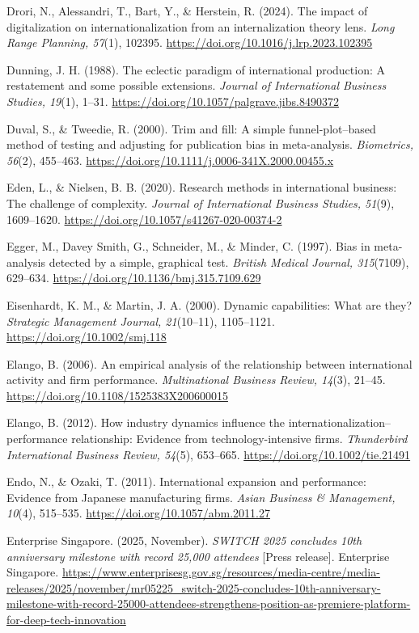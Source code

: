 \documentclass[
  a4paper,
  13pt]{extreport}
\begin{document}
Drori, N., Alessandri, T., Bart, Y., \& Herstein, R. (2024). The impact
of digitalization on internationalization from an internalization theory
lens. \emph{Long Range Planning, 57}(1), 102395.
\url{https://doi.org/10.1016/j.lrp.2023.102395}

Dunning, J. H. (1988). The eclectic paradigm of international
production: A restatement and some possible extensions. \emph{Journal of
International Business Studies, 19}(1), 1--31.
\url{https://doi.org/10.1057/palgrave.jibs.8490372}

Duval, S., \& Tweedie, R. (2000). Trim and fill: A simple
funnel-plot--based method of testing and adjusting for publication bias
in meta-analysis. \emph{Biometrics, 56}(2), 455--463.
\url{https://doi.org/10.1111/j.0006-341X.2000.00455.x}

Eden, L., \& Nielsen, B. B. (2020). Research methods in international
business: The challenge of complexity. \emph{Journal of International
Business Studies, 51}(9), 1609--1620.
\url{https://doi.org/10.1057/s41267-020-00374-2}

Egger, M., Davey Smith, G., Schneider, M., \& Minder, C. (1997). Bias in
meta-analysis detected by a simple, graphical test. \emph{British
Medical Journal, 315}(7109), 629--634.
\url{https://doi.org/10.1136/bmj.315.7109.629}

Eisenhardt, K. M., \& Martin, J. A. (2000). Dynamic capabilities: What
are they? \emph{Strategic Management Journal, 21}(10--11), 1105--1121.
\url{https://doi.org/10.1002/smj.118}

Elango, B. (2006). An empirical analysis of the relationship between
international activity and firm performance. \emph{Multinational
Business Review, 14}(3), 21--45.
\url{https://doi.org/10.1108/1525383X200600015}

Elango, B. (2012). How industry dynamics influence the
internationalization--performance relationship: Evidence from
technology-intensive firms. \emph{Thunderbird International Business
Review, 54}(5), 653--665. \url{https://doi.org/10.1002/tie.21491}

Endo, N., \& Ozaki, T. (2011). International expansion and performance:
Evidence from Japanese manufacturing firms. \emph{Asian Business \&
Management, 10}(4), 515--535. \url{https://doi.org/10.1057/abm.2011.27}

Enterprise Singapore. (2025, November). \emph{SWITCH 2025 concludes 10th
anniversary milestone with record 25,000 attendees} {[}Press release{]}.
Enterprise Singapore.
\url{https://www.enterprisesg.gov.sg/resources/media-centre/media-releases/2025/november/mr05225_switch-2025-concludes-10th-anniversary-milestone-with-record-25000-attendees-strengthens-position-as-premiere-platform-for-deep-tech-innovation}
\end{document}
